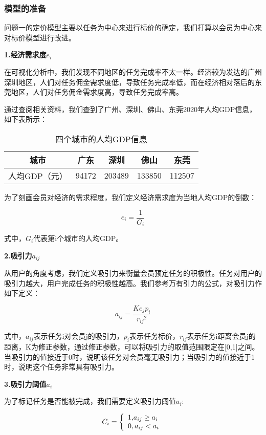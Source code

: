 \documentclass[withoutpreface,bwprint]{cumcmthesis} %
\begin{document}
\subsubsection{模型的准备}
问题一的定价模型主要以任务为中心来进行标价的确定，我们打算以会员为中心来对标价模型进行改进。

\textbf{1.经济需求度${e_i}$}

在可视化分析中，我们发现不同地区的任务完成率不太一样。经济较为发达的广州深圳地区，人们对任务佣金需求度低，导致任务完成率低，而在经济相对落后的东莞地区，人们对任务佣金需求度高，导致任务完成率高。

通过查阅相关资料，我们查到了广州、深圳、佛山、东莞2020年人均GDP信息，如下表所示：

\begin{table}[H]
	\centering
	\caption{四个城市的人均GDP信息}
	\begin{tabular}{|c|c|c|c|c|}
	\hline
	城市       & 广东    & 深圳     & 佛山     & 东莞     \\ \hline
	人均GDP（元） & 94172 & 203489 & 133850 & 112507 \\ \hline
	\end{tabular}
\end{table}


为了刻画会员对经济的需求程度，我们定义经济需求度为当地人均GDP的倒数：

\begin{equation}
{e_i} = \frac{1}{{{G_i}}}
\end{equation}

式中，${G_i}$代表第i个城市的人均GDP。

\textbf{2.吸引力${a_{ij}}$}

从用户的角度考虑，我们定义吸引力来衡量会员预定任务的积极性。任务对用户的吸引力越大，用户完成任务的积极性越高。我们参考万有引力的公式，对吸引力作如下定义：

\begin{equation}
{a_{ij}} = \frac{{K{e_j}{p_i}}}{{{r_{ij}}^2}}
\end{equation}

式中，${a_{ij}}$表示任务i对会员j的吸引力，${p_i}$表示任务标价，${r_{ij}}$表示任务i距离会员j的距离，K为修正参数，通过修正参数，可以将吸引力的取值范围限定在[0,1]之间。当吸引力的值接近于0时，说明该任务对会员毫无吸引力；当吸引力的值接近于1时，说明这个任务非常具有吸引力。
	
\textbf{3.吸引力阈值${a_{i}}$}

为了标记任务是否能被完成，我们需要定义吸引力阈值${a_{i}}$:

\begin{equation}
{C_i} = \left\{ \begin{array}{l}
{\rm{1,}}{a_{ij}} \ge {a_i}\\
0,{a_{ij}} < {a_i}
\end{array} \right.
\end{equation}
\end{document}
